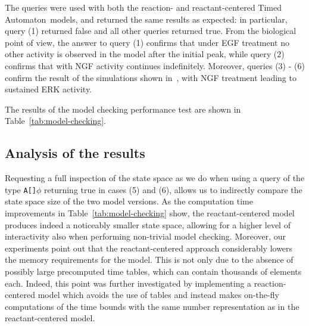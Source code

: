 \documentclass{llncs}
\newcommand{\ta}{Timed Automaton}
\begin{document}
The queries were used with both the reaction- and reactant-centered \ta\ models,
and returned the same results as expected: in particular, query (1) returned false and all other queries returned true.
From the biological point of view, the answer to query (1) confirms that under EGF treatment no other activity is observed in the model after the initial peak,
while query (2) confirms that with NGF activity continues indefinitely.
Moreover, queries (3) - (6) confirm the result of the simulations shown in~\cite{animo-ieee}, with NGF treatment leading to sustained ERK activity.

The results of the model checking performance test are shown in Table~\ref{tab:model-checking}.


\subsection{Analysis of the results}
Requesting a full inspection of the state space
as we do when using a query of the type {\tt A[]$\phi$} returning true in cases (5) and (6), allows us to indirectly compare the state space size of the two
model versions. As the computation time improvements in Table~\ref{tab:model-checking} show, the reactant-centered model produces
indeed a noticeably smaller state space, allowing for a higher level of interactivity also when performing non-trivial model checking.
Moreover, our experiments point out that the reactant-centered approach considerably lowers the memory
requirements for the model. This is not only due to the absence of possibly large precomputed time tables,
which can contain thousands of elements each.
Indeed, this point was further investigated by implementing a reaction-centered model which
avoids the use of tables and instead makes on-the-fly computations of the time bounds with the same number representation as in the reactant-centered model.
\end{document}
